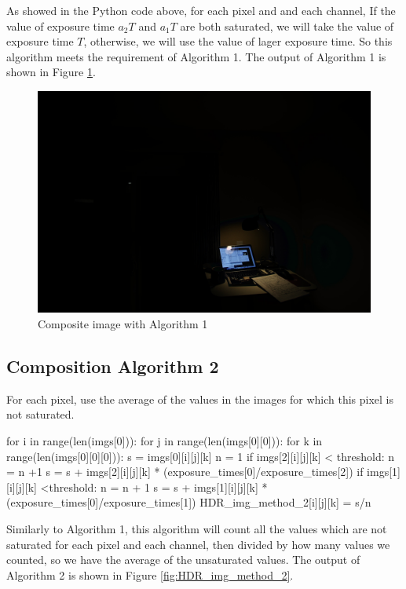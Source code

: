 \documentclass[10pt,twocolumn,letterpaper]{article}
\begin{document}
As showed in the Python code above, for each pixel and and each channel, If the value of exposure time $a_{2}T$ and $a_{1}T$ are both saturated, we will take the value of exposure time $T$, otherwise, we will use the value of lager exposure time. So this algorithm meets the requirement of Algorithm 1. The output of Algorithm 1 is shown in Figure \ref{fig:HDR_img_method_1}. 

\begin{figure}[bhp]
\includegraphics[width=\columnwidth]{images/hdr/combined/HDR_img_method_1}
\caption{Composite image with Algorithm 1}

\label{fig:HDR_img_method_1}
\end{figure}

\subsection{Composition Algorithm 2}
For each pixel, use the average of the values in the images for which this pixel is not saturated. \\
\begin{python}
for i in  range(len(imgs[0])):
	for j in range(len(imgs[0][0])):
		for k in range(len(imgs[0][0][0])):
			s = imgs[0][i][j][k] 
			n = 1
			if imgs[2][i][j][k] < threshold:
				n = n +1
				s = s + imgs[2][i][j][k] 
				* (exposure_times[0]/exposure_times[2])
			if imgs[1][i][j][k] <threshold:
				n = n + 1
				s = s + imgs[1][i][j][k] 
				* (exposure_times[0]/exposure_times[1])
			HDR_img_method_2[i][j][k] = s/n
\end{python}

Similarly to Algorithm 1, this algorithm will count all the values which are not saturated for each pixel and each channel, then divided by how many values we counted, so we have the average of the unsaturated values. The output of Algorithm 2 is shown in Figure \ref{fig:HDR_img_method_2}.
\end{document}
